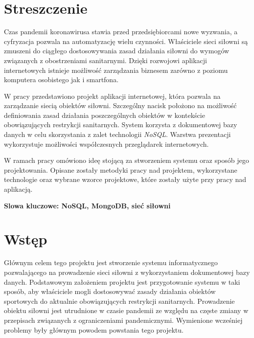 \documentclass[a4paper,twoside,12pt]{book}
\newcounter{stronyPozaNumeracja}
\begin{document}
\setcounter{stronyPozaNumeracja}{\value{page}}
\mainmatter
\pagestyle{empty}

\chapter*{Streszczenie}

Czas pandemii koronawirusa stawia przed przedsiębiorcami nowe wyzwania, a cyfryzacja pozwala na automatyzację wielu czynności. Właściciele sieci siłowni są zmuszeni do ciągłego dostosowywania zasad działania siłowni do wymogów związanych z obostrzeniami sanitarnymi. Dzięki rozwojowi aplikacji internetowych istnieje możliwość zarządzania biznesem zarówno z poziomu komputera osobistego jak i smartfona.

W pracy przedstawiono projekt aplikacji internetowej, która pozwala na zarządzanie siecią obiektów siłowni. Szczególny nacisk położono na możliwość definiowania zasad działania poszczególnych obiektów w kontekście obowiązujących restrykcji sanitarnych. System korzysta z dokumentowej bazy danych w celu skorzystania z zalet technologii \textit{NoSQL}. Warstwa prezentacji wykorzystuje możliwości współczesnych przeglądarek internetowych.

W ramach pracy omówiono ideę stojącą za stworzeniem systemu oraz sposób jego projektowania. Opisane zostały metodyki pracy nad projektem, wykorzystane technologie oraz wybrane wzorce projektowe, które zostały użyte przy pracy nad aplikacją.

{\bf Slowa kluczowe: NoSQL, MongoDB, sieć siłowni}


\cleardoublepage

\pagestyle{NumeryStronNazwyRozdzialow}


\chapter{Wstęp}

Głównym celem tego projektu jest stworzenie systemu informatycznego pozwalającego na prowadzenie sieci siłowni z wykorzystaniem dokumentowej bazy danych. Podstawowym założeniem projektu jest przygotowanie systemu w taki sposób, aby właściciele mogli dostosowywać zasady działania obiektów sportowych do aktualnie obowiązujących restrykcji sanitarnych. Prowadzenie obiektu siłowni jest utrudnione w czasie pandemii ze względu na częste zmiany w przepisach związanych z ograniczeniami pandemicznymi. Wymienione wcześniej problemy były głównym powodem powstania tego projektu.
\end{document}
